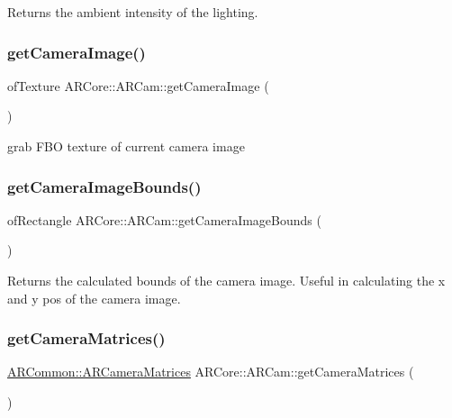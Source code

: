 Returns the ambient intensity of the lighting. 

\mbox{\label{class_a_r_core_1_1_a_r_cam_a7e0e81c2a201955219364f5e3f1b1915}} 
\subsubsection{\texorpdfstring{get\+Camera\+Image()}{getCameraImage()}}
{\footnotesize\ttfamily of\+Texture A\+R\+Core\+::\+A\+R\+Cam\+::get\+Camera\+Image (\begin{DoxyParamCaption}{ }\end{DoxyParamCaption})}



grab F\+BO texture of current camera image 

\mbox{\label{class_a_r_core_1_1_a_r_cam_abd6a08f527d91cb750b03ef12a52afe5}} 
\subsubsection{\texorpdfstring{get\+Camera\+Image\+Bounds()}{getCameraImageBounds()}}
{\footnotesize\ttfamily of\+Rectangle A\+R\+Core\+::\+A\+R\+Cam\+::get\+Camera\+Image\+Bounds (\begin{DoxyParamCaption}{ }\end{DoxyParamCaption})}

Returns the calculated bounds of the camera image. Useful in calculating the x and y pos of the camera image. \mbox{\label{class_a_r_core_1_1_a_r_cam_a1398ffe9720425cfbc99635b08bc80d6}} 
\subsubsection{\texorpdfstring{get\+Camera\+Matrices()}{getCameraMatrices()}}
{\footnotesize\ttfamily \mbox{\hyperlink{struct_a_r_common_1_1_a_r_camera_matrices}{A\+R\+Common\+::\+A\+R\+Camera\+Matrices}} A\+R\+Core\+::\+A\+R\+Cam\+::get\+Camera\+Matrices (\begin{DoxyParamCaption}{ }\end{DoxyParamCaption})\hspace{0.3cm}{\ttfamily [inline]}}




